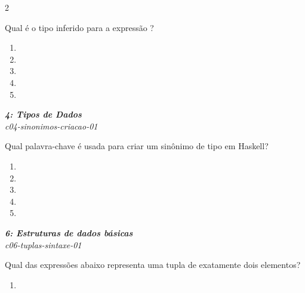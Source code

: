 \documentclass[a4paper,10pt,brazil]{article}
\begin{document}
\begin{multicols}{2}
\begin{flushright}
\end{flushright}
Qual é o tipo inferido para a expressão ?

\begin{enumerate}
  \item {}

  \item {}

  \item {}

  \item {}

  \item {}


\end{enumerate}

\begin{flushright}
  \footnotesize
  \textit{\textbf{4: Tipos de Dados}}\\
  \textit{c04-sinonimos-criacao-01}\\

\end{flushright}
Qual palavra-chave é usada para criar um sinônimo de tipo em Haskell?

\begin{enumerate}
  \item {}

  \item {}

  \item {}

  \item {}

  \item {}


\end{enumerate}

\begin{flushright}
  \footnotesize
  \textit{\textbf{6: Estruturas de dados básicas}}\\
  \textit{c06-tuplas-sintaxe-01}\\

\end{flushright}
Qual das expressões abaixo representa uma tupla de exatamente dois elementos?

\begin{enumerate}
  \item {}


\end{enumerate}
\end{multicols}
\end{document}
